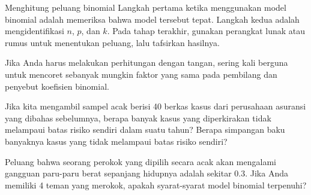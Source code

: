 \begin{onebox}{Menghitung peluang binomial}
  Langkah pertama ketika menggunakan model binomial adalah memeriksa
  bahwa model tersebut tepat. Langkah kedua adalah mengidentifikasi $n$,
  $p$, dan $k$. Pada tahap terakhir, gunakan perangkat lunak atau rumus
  untuk menentukan peluang, lalu tafsirkan hasilnya.%
  \vspace{3mm}

  Jika Anda harus melakukan perhitungan dengan tangan, sering kali
  berguna untuk mencoret sebanyak mungkin faktor yang sama pada pembilang
  dan penyebut koefisien binomial.
\end{onebox}

\begin{exercisewrap}
\begin{nexercise}
Jika kita mengambil sampel acak berisi 40 berkas kasus dari perusahaan
asuransi yang dibahas sebelumnya, berapa banyak kasus yang diperkirakan
tidak melampaui batas risiko sendiri dalam suatu tahun? Berapa simpangan
baku banyaknya kasus yang tidak melampaui batas risiko sendiri?\footnotemark{}
\end{nexercise}
\end{exercisewrap}

\begin{exercisewrap}
\begin{nexercise}
Peluang bahwa seorang perokok yang dipilih secara acak akan mengalami
gangguan paru-paru berat sepanjang hidupnya adalah sekitar $0.3$.
Jika Anda memiliki 4 teman yang merokok, apakah syarat-syarat model
binomial terpenuhi?\footnotemark{}
\end{nexercise}
\end{exercisewrap}

